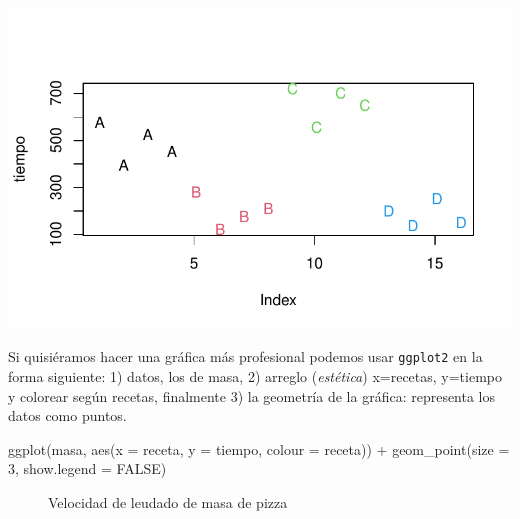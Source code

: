 \documentclass[
  letterpaper,
  DIV=11,
  numbers=noendperiod]{scrartcl}
\newenvironment{Shaded}{\begin{snugshade}}{\end{snugshade}}
\newcommand{\AttributeTok}[1]{\textcolor[rgb]{0.40,0.45,0.13}{#1}}
\newcommand{\ConstantTok}[1]{\textcolor[rgb]{0.56,0.35,0.01}{#1}}
\newcommand{\DecValTok}[1]{\textcolor[rgb]{0.68,0.00,0.00}{#1}}
\newcommand{\FunctionTok}[1]{\textcolor[rgb]{0.28,0.35,0.67}{#1}}
\newcommand{\NormalTok}[1]{\textcolor[rgb]{0.00,0.23,0.31}{#1}}
\newcommand{\SpecialCharTok}[1]{\textcolor[rgb]{0.37,0.37,0.37}{#1}}
\begin{document}
\includegraphics{solucion-masa-pizza_files/figure-pdf/explora-1.pdf}

Si quisiéramos hacer una gráfica más profesional podemos usar
\texttt{ggplot2} en la forma siguiente: 1) datos, los de masa, 2)
arreglo (\emph{estética}) x=recetas, y=tiempo y colorear según recetas,
finalmente 3) la geometría de la gráfica: representa los datos como
puntos.

\begin{Shaded}
\begin{Highlighting}[]
\FunctionTok{ggplot}\NormalTok{(masa, }\FunctionTok{aes}\NormalTok{(}\AttributeTok{x =}\NormalTok{ receta, }\AttributeTok{y =}\NormalTok{ tiempo, }\AttributeTok{colour =}\NormalTok{ receta)) }\SpecialCharTok{+}
  \FunctionTok{geom\_point}\NormalTok{(}\AttributeTok{size =} \DecValTok{3}\NormalTok{, }\AttributeTok{show.legend =} \ConstantTok{FALSE}\NormalTok{)}
\end{Highlighting}
\end{Shaded}

\begin{figure}[H]


\caption{\label{fig-ggp-explora}Velocidad de leudado de masa de pizza}

\end{figure}%
\end{document}
